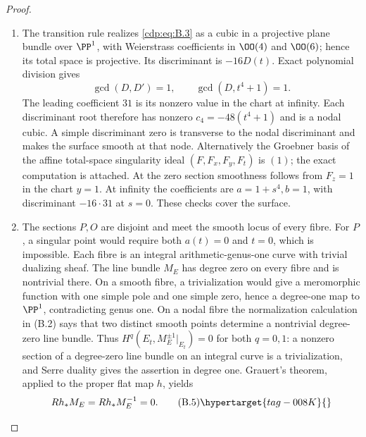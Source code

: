 \begin{proof}

\begin{enumerate}[label={$\langle1\rangle$\arabic*.},leftmargin=*]
\item The transition rule realizes \eqref{cdp:eq:B.3} as a cubic in a projective plane bundle over $\PP^1$, with Weierstrass coefficients in $\OO(4)$ and $\OO(6)$; hence its total space is projective. Its discriminant is $-16D(t)$. Exact polynomial division gives
\[
 \gcd(D,D')=1,\qquad \gcd(D,t^4+1)=1.
\]
The leading coefficient $31$ is its nonzero value in the chart at infinity. Each discriminant root therefore has nonzero $c_4=-48(t^4+1)$ and is a nodal cubic. A simple discriminant zero is transverse to the nodal discriminant and makes the surface smooth at that node. Alternatively the Groebner basis of the affine total-space singularity ideal $(F,F_x,F_y,F_t)$ is $(1)$; the exact computation is attached. At the zero section smoothness follows from $F_z=1$ in the chart $y=1$. At infinity the coefficients are $a=1+s^4,b=1$, with discriminant $-16\cdot31$ at $s=0$. These checks cover the surface.

\item The sections $P,O$ are disjoint and meet the smooth locus of every fibre. For $P$, a singular point would require both $a(t)=0$ and $t=0$, which is impossible. Each fibre is an integral arithmetic-genus-one curve with trivial dualizing sheaf. The line bundle $M_E$ has degree zero on every fibre and is nontrivial there. On a smooth fibre, a trivialization would give a meromorphic function with one simple pole and one simple zero, hence a degree-one map to $\PP^1$, contradicting genus one. On a nodal fibre the normalization calculation in (B.2) says that two distinct smooth points determine a nontrivial degree-zero line bundle. Thus $H^q(E_t,M_E^{\pm1}|_{E_t})=0$ for both $q=0,1$: a nonzero section of a degree-zero line bundle on an integral curve is a trivialization, and Serre duality gives the assertion in degree one. Grauert's theorem, applied to the proper flat map $h$, yields
\[
 Rh_*M_E=Rh_*M_E^{-1}=0.                               \tag{B.5}\hypertarget{tag-008K}{}\label{cdp:eq:B.5}
\]


\end{enumerate}
\end{proof}
